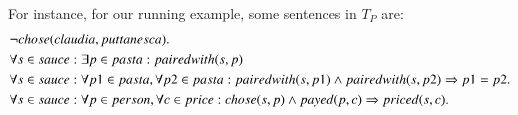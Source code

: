 For instance, for our running example, some sentences in $T_P$ are: 
\begin{align*}
 &\lnot chose(claudia,puttanesca).\\
 & \forall s\in sauce : \exists p\in pasta : pairedwith(s,p)\\
 & \forall s\in sauce: \forall p1\in pasta, \forall p2\in pasta:  pairedwith(s,p1)\land pairedwith(s,p2)\limplies p1=p2. \\
 & \forall s\in sauce: \forall p\in person, \forall c\in price: chose(s,p)\land payed(p,c)\limplies priced(s,c).  %
\end{align*}



